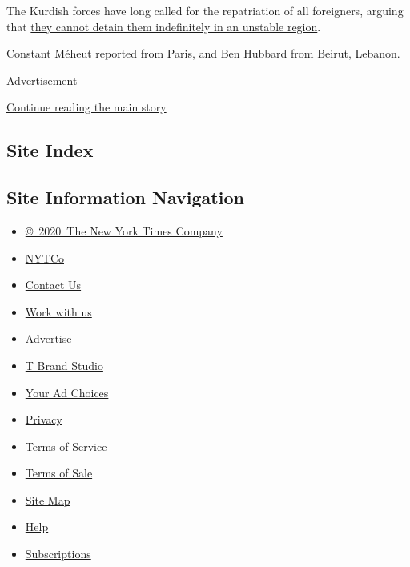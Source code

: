 The Kurdish forces have long called for the repatriation of all
foreigners, arguing that
\href{https://www.nytimes3xbfgragh.onion/2019/10/13/us/politics/isis-prisoners-kurds.html}{they
cannot detain them indefinitely in an unstable region}.

Constant Méheut reported from Paris, and Ben Hubbard from Beirut,
Lebanon.

Advertisement

\protect\hyperlink{after-bottom}{Continue reading the main story}

\hypertarget{site-index}{%
\subsection{Site Index}\label{site-index}}

\hypertarget{site-information-navigation}{%
\subsection{Site Information
Navigation}\label{site-information-navigation}}

\begin{itemize}
\tightlist
\item
  \href{https://help.nytimes3xbfgragh.onion/hc/en-us/articles/115014792127-Copyright-notice}{©~2020~The
  New York Times Company}
\end{itemize}

\begin{itemize}
\tightlist
\item
  \href{https://www.nytco.com/}{NYTCo}
\item
  \href{https://help.nytimes3xbfgragh.onion/hc/en-us/articles/115015385887-Contact-Us}{Contact
  Us}
\item
  \href{https://www.nytco.com/careers/}{Work with us}
\item
  \href{https://nytmediakit.com/}{Advertise}
\item
  \href{http://www.tbrandstudio.com/}{T Brand Studio}
\item
  \href{https://www.nytimes3xbfgragh.onion/privacy/cookie-policy\#how-do-i-manage-trackers}{Your
  Ad Choices}
\item
  \href{https://www.nytimes3xbfgragh.onion/privacy}{Privacy}
\item
  \href{https://help.nytimes3xbfgragh.onion/hc/en-us/articles/115014893428-Terms-of-service}{Terms
  of Service}
\item
  \href{https://help.nytimes3xbfgragh.onion/hc/en-us/articles/115014893968-Terms-of-sale}{Terms
  of Sale}
\item
  \href{https://spiderbites.nytimes3xbfgragh.onion}{Site Map}
\item
  \href{https://help.nytimes3xbfgragh.onion/hc/en-us}{Help}
\item
  \href{https://www.nytimes3xbfgragh.onion/subscription?campaignId=37WXW}{Subscriptions}
\end{itemize}

